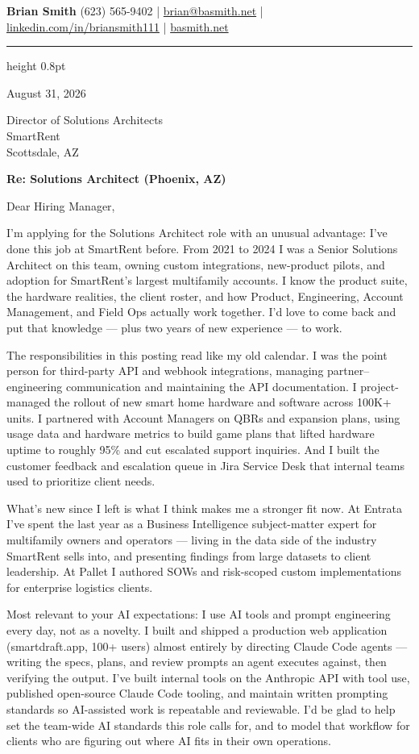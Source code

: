\documentclass[11pt,letterpaper]{article}
\begin{document}
{\huge\bfseries Brian Smith}\hfill
{\small (623) 565-9402 \;|\; \href{mailto:brian@basmith.net}{brian@basmith.net} \;|\;
\href{https://www.linkedin.com/in/briansmith111}{linkedin.com/in/briansmith111} \;|\;
\href{https://basmith.net}{basmith.net}}\par
\vspace{3pt}
{\color{rulegray}\hrule height 0.8pt}

\vspace{6pt}
August 31, 2026

Director of Solutions Architects\\
SmartRent\\
Scottsdale, AZ

\textbf{Re: Solutions Architect (Phoenix, AZ)}

Dear Hiring Manager,

I'm applying for the Solutions Architect role with an unusual advantage: I've done this job at SmartRent before. From 2021 to 2024 I was a Senior Solutions Architect on this team, owning custom integrations, new-product pilots, and adoption for SmartRent's largest multifamily accounts. I know the product suite, the hardware realities, the client roster, and how Product, Engineering, Account Management, and Field Ops actually work together. I'd love to come back and put that knowledge — plus two years of new experience — to work.

The responsibilities in this posting read like my old calendar. I was the point person for third-party API and webhook integrations, managing partner–engineering communication and maintaining the API documentation. I project-managed the rollout of new smart home hardware and software across 100K+ units. I partnered with Account Managers on QBRs and expansion plans, using usage data and hardware metrics to build game plans that lifted hardware uptime to roughly 95\% and cut escalated support inquiries. And I built the customer feedback and escalation queue in Jira Service Desk that internal teams used to prioritize client needs.

What's new since I left is what I think makes me a stronger fit now. At Entrata I've spent the last year as a Business Intelligence subject-matter expert for multifamily owners and operators — living in the data side of the industry SmartRent sells into, and presenting findings from large datasets to client leadership. At Pallet I authored SOWs and risk-scoped custom implementations for enterprise logistics clients.

Most relevant to your AI expectations: I use AI tools and prompt engineering every day, not as a novelty. I built and shipped a production web application (smartdraft.app, 100+ users) almost entirely by directing Claude Code agents — writing the specs, plans, and review prompts an agent executes against, then verifying the output. I've built internal tools on the Anthropic API with tool use, published open-source Claude Code tooling, and maintain written prompting standards so AI-assisted work is repeatable and reviewable. I'd be glad to help set the team-wide AI standards this role calls for, and to model that workflow for clients who are figuring out where AI fits in their own operations.
\end{document}
